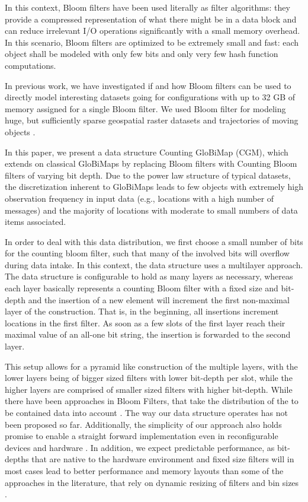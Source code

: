 \documentclass[sigconf]{acmart}
\begin{document}
In this context, Bloom filters have been used literally as filter algorithms: they provide a compressed representation of what there might be in a data block and can reduce irrelevant I/O operations significantly with a small memory overhead. In this scenario, Bloom filters are optimized to be extremely small and fast: each object shall be modeled with only few bits and only very few hash function computations.

In previous work, we have investigated if and how Bloom filters can be used to directly model interesting datasets going for configurations with up to 32 GB of memory assigned for a single Bloom filter. We used Bloom filter for modeling huge, but sufficiently sparse geospatial raster datasets \cite{werner2019globimaps, werner2021globimapsai} and trajectories of moving objects \cite{werner2015bacr}.

In this paper, we present a data structure Counting GloBiMap (CGM), which extends on classical GloBiMaps \cite{werner2019globimaps} by replacing
Bloom filters with Counting Bloom filters of varying bit depth. Due to the power law structure of typical datasets, the discretization inherent to
GloBiMaps leads to few objects with extremely high observation frequency in input data (e.g., locations with a high number of messages) and the majority of locations with moderate to small numbers of data items associated.

In order to deal with this data distribution, we first choose a small number of bits for the counting bloom filter, such that many of the involved bits will overflow during data intake. In this context, the data structure uses a multilayer approach. The data structure is configurable to hold as many layers as necessary, whereas each layer basically represents a counting Bloom filter with a fixed size and bit-depth and the insertion of a new element will increment the first non-maximal layer of the construction. That is, in the beginning, all insertions increment locations in the first filter. As soon as a few slots of the first layer reach their maximal value of an all-one bit string, the insertion is forwarded to the second layer.

This setup allows for a pyramid like construction of the multiple layers, with the lower layers being of bigger sized filters with lower bit-depth per slot, while the higher layers are comprised of smaller sized filters with higher bit-depth. While there have been approaches in Bloom Filters, that take the distribution of the to be contained data into account \cite{ficara_multilayer_2008} \cite{bruck2006weighted}. The way our data structure operates has not been proposed so far. Additionally, the simplicity of our approach also holds promise to enable a straight forward implementation even in reconfigurable devices and hardware \cite{cho2014fpga, ramachandran2015fpga, harwayne2009fpga}. In addition, we expect predictable performance, as bit-depths that are native to the hardware environment and fixed size filters will in most cases lead to better performance and memory layouts than some of the approaches in the literature, that rely on dynamic resizing of filters and bin sizes \cite{guo2009dynamic}.
\end{document}
